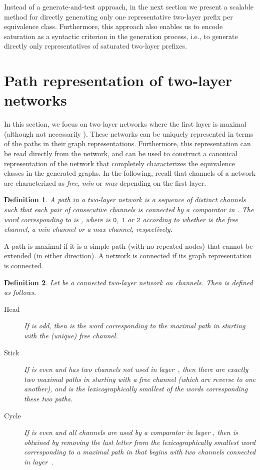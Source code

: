 \documentclass[10pt]{IEEEtran}
\newcommand{\sent}[1]{\ensuremath{\mathtt{#1}}} \newcommand{\GG}{{\cal G}}
\newtheorem{definition}{Definition}
\begin{document}
{{Instead of a generate-and-test approach, in the next section we
present a scalable method for directly generating only one
representative two-layer prefix per equivalence class. Furthermore,
this approach also enables us to encode saturation as a syntactic
criterion in the generation process, i.e., to generate directly only
representatives of saturated two-layer prefixes.



\section{Path representation of two-layer networks}
\label{sec:pathrep}

In this section, we focus on two-layer networks where the first layer
is maximal (although not necessarily ).  These networks can be
uniquely represented in terms of the paths in their graph
representations. Furthermore, this representation can be read directly
from the network, and can be used to construct a canonical
representation of the network that completely characterizes the
equivalence classes in the generated graphs.  In the following, recall
that channels of a network are characterized as \emph{free},
\emph{min} or \emph{max} depending on the first layer.


\begin{definition}\label{def:path}
  A \emph{path} in a two-layer network  is a sequence
   of distinct channels such that each pair
  of consecutive channels is connected by a comparator in .
The \emph{word} corresponding to  is
  , where  is \sent{0}, \sent{1} or \sent{2}
  according to whether  is the free channel, a min channel or a
  max channel, respectively.
\end{definition}

A path is maximal if it is a simple path (with no repeated nodes) that
cannot be extended (in either direction).  A network is connected if
its graph representation is connected.

\begin{definition}
  Let  be a connected two-layer network on  channels.  Then
   is defined as follows.

  \begin{description}
  \item[Head]If  is odd, then  is the word
    corresponding to the maximal path in  starting with
    the (unique) free channel. 
\item[Stick]If  is even and  has two channels not used
    in layer~, then there are exactly two maximal paths in  starting
    with a free channel (which are reverse to one another), and
     is the lexicographically smallest of
    the words corresponding these two paths.
  \item[Cycle]If  is even and all channels are used by a
    comparator in layer , then  is obtained by removing
    the last letter from the lexicographically
    smallest word corresponding to a maximal path in  that
    begins with two channels connected in layer~.
  \end{description}
\end{definition}



}}
\end{document}
